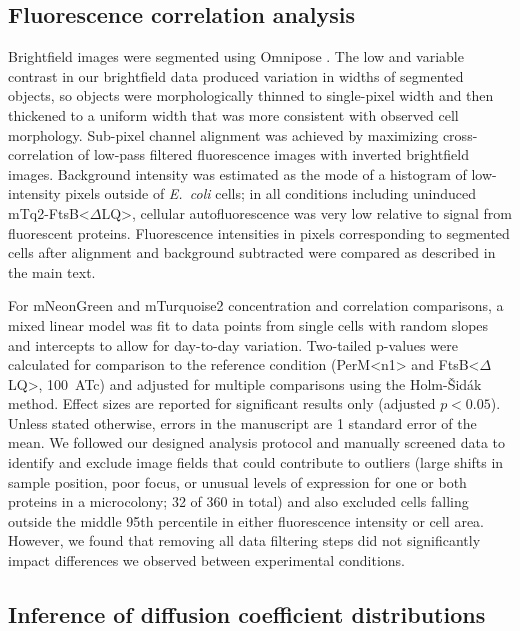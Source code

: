 \documentclass[twocolumn,pdflatex,sn-nature]{sn-jnl}%
\def\textsuperscript#1{<#1>}%
\newcommand\ec{\textit{E.~coli}}
\newcommand\ftsbdLQ{FtsB\textsuperscript{$\Delta{}$LQ}}
\newcommand\permN{PerM\textsuperscript{n1}}
\begin{document}
\subsection{Fluorescence correlation analysis}

Brightfield images were segmented using Omnipose \citep{cutlerOmniposeHighprecisionMorphologyindependent2022}.
The low and variable contrast in our brightfield data produced variation in widths of segmented objects, so objects were morphologically thinned to single-pixel width and then thickened to a uniform width that was more consistent with observed cell morphology.
Sub-pixel channel alignment was achieved by maximizing cross-correlation of low-pass filtered fluorescence images with inverted brightfield images.
Background intensity was estimated as the mode of a histogram of low-intensity pixels outside of \ec{} cells; in all conditions including uninduced mTq2-\ftsbdLQ{}, cellular autofluorescence was very low relative to signal from fluorescent proteins.
Fluorescence intensities in pixels corresponding to segmented cells after alignment and background subtracted were compared as described in the main text.

For mNeonGreen and mTurquoise2 concentration and correlation comparisons, a mixed linear model was fit to data points from single cells with random slopes and intercepts to allow for day-to-day variation.
Two-tailed p-values were calculated for comparison to the reference condition (\permN{} and \ftsbdLQ{}, \qty{100}{\nM}~ATc) and adjusted for multiple comparisons using the Holm-Šidák method.
Effect sizes are reported for significant results only (adjusted $p<0.05$).
Unless stated otherwise, errors in the manuscript are 1 standard error of the mean.
We followed our designed analysis protocol and manually screened data to identify and exclude image fields that could contribute to outliers (large shifts in sample position, poor focus, or unusual levels of expression for one or both proteins in a microcolony; 32 of 360 in total) and also excluded cells falling outside the middle 95th percentile in either fluorescence intensity or cell area.
However, we found that removing all data filtering steps did not significantly impact differences we observed between experimental conditions.

\subsection{Inference of diffusion coefficient distributions}
\end{document}
